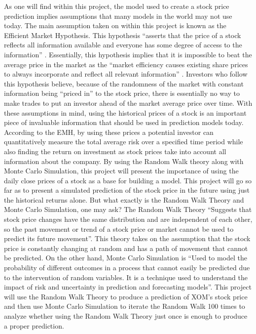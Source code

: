 \documentclass{article}
\begin{document}
As one will find within this project, the model used to create a stock price prediction implies assumptions that many models in the world may not use today. The main assumption taken on within this project is known as the Efficient Market Hypothesis. This hypothesis “asserts that the price of a stock reflects all information available and everyone has some degree of access to the information” \cite{Xu 2007}. Essentially, this hypothesis implies that it is impossible to beat the average price in the market as the “market efficiency causes existing share prices to always incorporate and reflect all relevant information” \cite{Investopedia}. Investors who follow this hypothesis believe, because of the randomness of the market with constant information being “priced in” to the stock price, there is essentially no way to make trades to put an investor ahead of the market average price over time. With these assumptions in mind, using the historical prices of a stock is an important piece of invaluable information that should be used in prediction models today. According to the EMH, by using these prices a potential investor can quantitatively measure the total average risk over a specified time period while also finding the return on investment as stock prices take into account all information about the company. By using the Random Walk theory along with Monte Carlo Simulation, this project will present the importance of using the daily close prices of a stock as a base for building a model. This project will go so far as to present a simulated prediction of the stock price in the future using just the historical returns alone. But what exactly is the Random Walk Theory and Monte Carlo Simulation, one may ask? The Random Walk Theory “Suggests that stock price changes have the same distribution and are independent of each other, so the past movement or trend of a stock price or market cannot be used to predict its future movement”\cite{Investopedia}. This theory takes on the assumption that the stock price is constantly changing at random and has a path of movement that cannot be predicted. On the other hand, Monte Carlo Simulation is “Used to model the probability of different outcomes in a process that cannot easily be predicted due to the intervention of random variables. It is a technique used to understand the impact of risk and uncertainty in prediction and forecasting models”\cite{Investopedia}. This project will use the Random Walk Theory to produce a prediction of XOM’s stock price and then use Monte Carlo Simulation to iterate the Random Walk 100 times to analyze whether using the Random Walk Theory just once is enough to produce a proper prediction.
\end{document}
